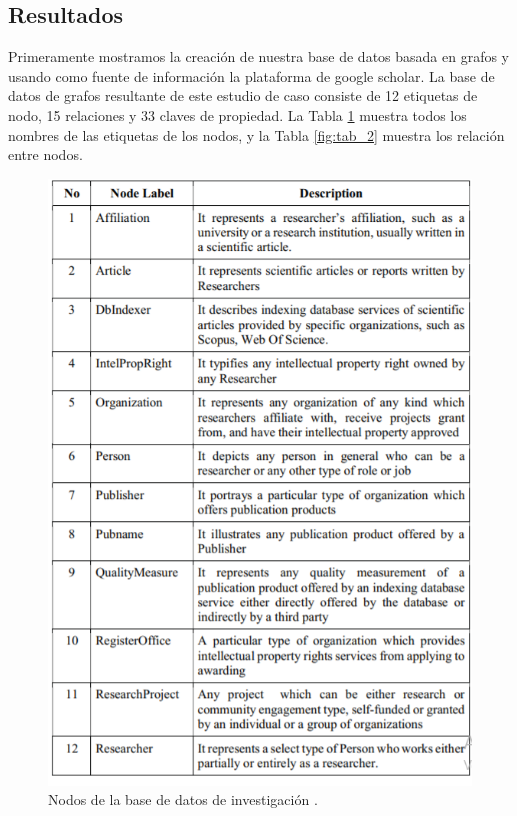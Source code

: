 \subsection{Resultados}
Primeramente mostramos la creación de nuestra base de datos basada en grafos y usando como fuente de información la plataforma de google scholar.
La base de datos de grafos resultante de este estudio de caso consiste
de 12 etiquetas de nodo, 15 relaciones y 33 claves de propiedad.
La Tabla \ref{fig:tab_1} muestra todos los nombres de las etiquetas de los nodos, y la Tabla \ref{fig:tab_2} muestra los relación entre nodos.
\begin{figure}[H]
    \centering
    \includegraphics[scale=0.7]{Graficos/nodos.png}
    \caption{Nodos de la base de datos de investigación \cite{afandi2020university}.}
    \label{fig:tab_1}
\end{figure}
